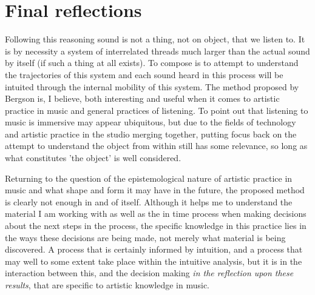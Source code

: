\documentclass[11pt]{article}
\begin{document}
\section*{Final reflections}
\label{sec:org0550bd1}
Following this reasoning sound is not a thing, not on object, that we listen to. It is by necessity a system of interrelated threads much larger than the actual sound by itself (if such a thing at all exists). To compose is to attempt to understand the trajectories of this system and each sound heard in this process will be intuited through the internal mobility of this system.
The method proposed by Bergson is, I believe, both interesting and useful when it comes to artistic practice in music and general practices of listening.
To point out that listening to music is immersive may appear ubiquitous, but due to the fields of technology and artistic practice in the studio merging together, putting focus back on the attempt to understand the object from within still  has some relevance, so long as what constitutes 'the object' is well considered.

Returning to the question of the epistemological nature of artistic practice in music and what shape and form it may have in the future, the proposed method is clearly not enough in and of itself.
Although it helps me to understand the material I am working with as well as the in time  process when making decisions about the next steps in the process, the specific knowledge in this practice lies in the ways these decisions are being made, not merely what material is being discovered.
A process that is certainly informed by intuition, and a process that may well to some extent take place within the intuitive analysis, but it is in the interaction between this, and the decision making \emph{in the reflection upon these results}, that are specific to artistic knowledge in music.
\end{document}
